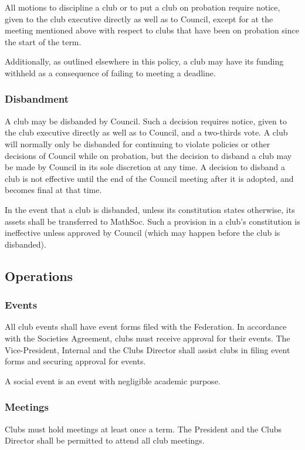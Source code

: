 All motions to discipline a club or to put a club on probation require notice,
given to the club executive directly as well as to Council, except for at the
meeting mentioned above with respect to clubs that have been on probation since
the start of the term.

Additionally, as outlined elsewhere in this policy, a club may have its funding
withheld as a consequence of failing to meeting a deadline.

\subsubsection{Disbandment}
A club may be disbanded by Council. Such a decision requires notice, given to
the club executive directly as well as to Council, and a two-thirds vote. A club
will normally only be disbanded for continuing to violate policies or other
decisions of Council while on probation, but the decision to disband a club may
be made by Council in its sole discretion at any time. A decision to disband a
club is not effective until the end of the Council meeting after it is adopted,
and becomes final at that time.

In the event that a club is disbanded, unless its constitution states otherwise,
its assets shall be transferred to MathSoc. Such a provision in a club's
constitution is ineffective unless approved by Council (which may happen before
the club is disbanded).

\subsection{Operations}
\subsubsection{Events}
All club events shall have event forms filed with the Federation. In accordance
with the Societies Agreement, clubs must receive approval for their events.  The
Vice-President, Internal and the Clubs Director shall assist clubs in filing
event forms and securing approval for events.

A social event is an event with negligible academic purpose.

\subsubsection{Meetings}
Clubs must hold meetings at least once a term. The President and the Clubs
Director shall be permitted to attend all club meetings.

